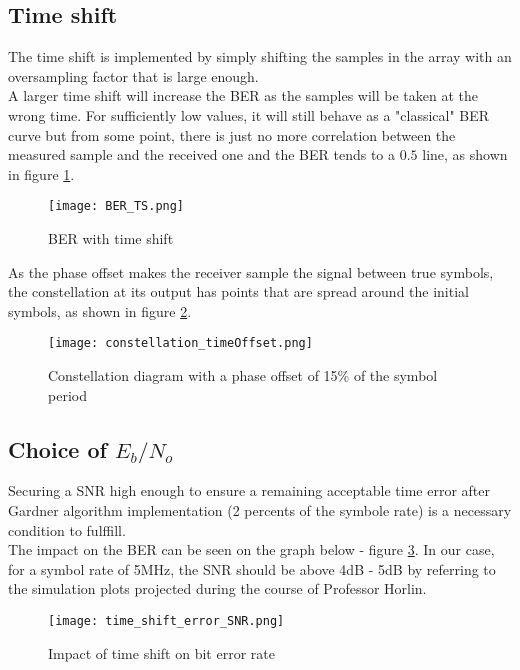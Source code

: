 \subsection{Time shift}
The time shift is implemented by simply shifting the samples in the array with an oversampling factor that is large enough. \\
A larger time shift will increase the BER as the samples will be taken at the wrong time. For sufficiently low values, it will still behave as a "classical" BER curve but from some point, there is just no more correlation between the measured sample and the received one and the BER tends to a $0.5$ line, as shown in figure \ref{fig:BER_TS}. \\

\begin{figure}[H]
    \centering
    \texttt{[image: BER\_TS.png]}
    \caption{BER with time shift}
    \label{fig:BER_TS}
\end{figure}

As the phase offset makes the receiver sample the signal between true symbols, the constellation at its output has points that are spread around the initial symbols, as shown in figure \ref{fig:phaseShiftConst}. 

\begin{figure}[H]
    \centering
    \texttt{[image: constellation\_timeOffset.png]}
    \caption{Constellation diagram with a phase offset of 15\% of the symbol period}
    \label{fig:phaseShiftConst}
\end{figure}

\subsection{Choice of $E_{b}/N_{o}$}
Securing a SNR high enough to ensure a remaining acceptable time error after Gardner algorithm implementation
 (2 percents of the symbole rate) is a necessary condition to fulffill.\\
The impact on the BER can be seen on the graph below - figure \ref{fig:time_shift_error_SNR}.
In our case, for a symbol rate of 5MHz, the SNR should be above 4dB - 5dB by referring to the simulation plots projected 
during the course of Professor Horlin.

\begin{figure}[H]
    \centering
    \texttt{[image: time\_shift\_error\_SNR.png]}
    \caption{Impact of time shift on bit error rate}
    \label{fig:time_shift_error_SNR}
\end{figure}

